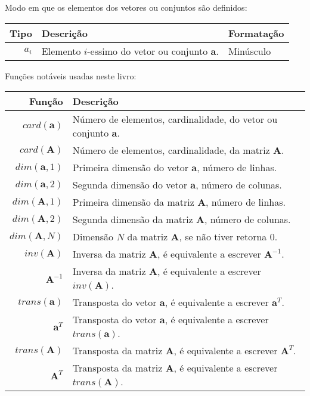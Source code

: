 \begin{notation}Modo em que os elementos dos vetores ou conjuntos são definidos:\\
\begin{tabular}{r | p{.6\linewidth} | l}
\hline	
Tipo & Descrição & Formatação \\ \hline
$a_{i}$ & Elemento $i$-essimo do vetor ou conjunto  $\mathbf{a}$.& Minúsculo \\
\end{tabular}
\end{notation}


\begin{notation}Funções notáveis usadas neste livro:\\
\begin{tabular}{r | l }
\hline	
Função & Descrição \\ \hline
$card(\mathbf{a})$ & Número de elementos, cardinalidade, do vetor ou conjunto $\mathbf{a}$. \\
$card(\mathbf{A})$ & Número de elementos, cardinalidade, da matriz $\mathbf{A}$. \\
\hline
$dim(\mathbf{a},1)$ & Primeira dimensão do vetor $\mathbf{a}$, número de linhas. \\
$dim(\mathbf{a},2)$ & Segunda dimensão do vetor $\mathbf{a}$, número de colunas. \\
$dim(\mathbf{A},1)$ & Primeira dimensão da matriz $\mathbf{A}$, número de linhas. \\
$dim(\mathbf{A},2)$ & Segunda dimensão da matriz $\mathbf{A}$, número de colunas. \\
$dim(\mathbf{A},N)$ & Dimensão $N$ da matriz $\mathbf{A}$, se não tiver retorna $0$. \\
\hline
$inv(\mathbf{A})$ & Inversa da matriz $\mathbf{A}$, é equivalente a escrever $\mathbf{A}^{-1}$. \\
$\mathbf{A}^{-1}$ & Inversa da matriz $\mathbf{A}$, é equivalente a escrever $inv(\mathbf{A})$. \\
\hline
$trans(\mathbf{a})$ & Transposta do vetor $\mathbf{a}$, é equivalente a escrever $\mathbf{a}^{T}$. \\
$\mathbf{a}^{T}$ & Transposta do vetor $\mathbf{a}$, é equivalente a escrever $trans(\mathbf{a})$. \\
$trans(\mathbf{A})$ & Transposta da matriz $\mathbf{A}$, é equivalente a escrever $\mathbf{A}^{T}$. \\
$\mathbf{A}^{T}$ & Transposta da matriz $\mathbf{A}$, é equivalente a escrever $trans(\mathbf{A})$. \\
\end{tabular}
\end{notation}

